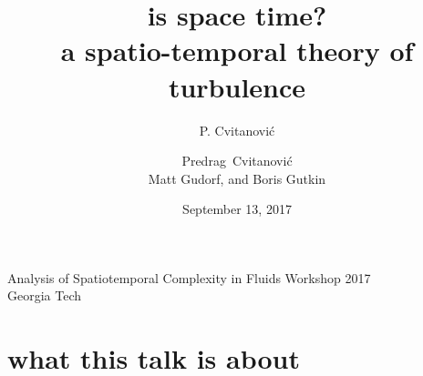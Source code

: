 


\usepackage[font=scriptsize, labelfont=bf]{caption}
\usepackage[
    backend=biber,  %
    sorting=nyt,
    style=numeric, %
    natbib=true,
    style=phys, %
    biblabel= brackets, %
    articletitle=false, %
    pageranges = true , %
    sortlocale=en_US,
    firstinits=true,
    url=false, %
    doi=false, %
    eprint=false
]{biblatex}



\renewcommand{\Ssym}[1]{{\ensuremath{m_{#1}}}}    %




\title{
{\huge is space time?}
    \\
{a spatio-temporal theory of turbulence}
}
\author{P. Cvitanovi\'c}
\author[Cvitanovi\'c]
{
  \textcolor{green!50!black}{
  {Predrag~Cvitanovi\'c \\
  Matt Gudorf,
  and
  Boris Gutkin
  }	%
  }
}
\institute
{
Analysis of Spatiotemporal Complexity in Fluids Workshop 2017
\\
Georgia Tech
 }
\date{September 13, 2017}

\begin{frame}
  \titlepage
\end{frame}


\section[what this talk is about]
 {what this talk is about}


